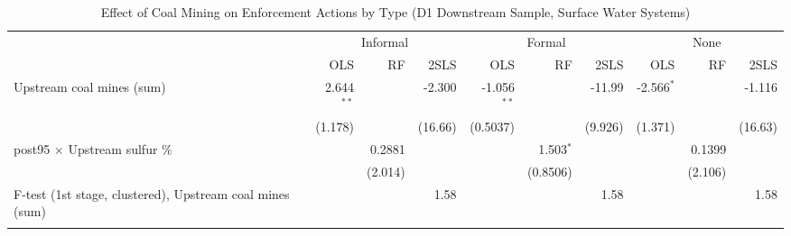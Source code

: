 
\begin{table}[htbp]
   
   \caption{\label{tab:h3_inf_formal_d12_surfacewater} Effect of Coal Mining on Enforcement Actions by Type (D1 Downstream Sample, Surface Water Systems)}
   \bigskip
   
   \centering
   
   \begin{adjustbox}{width = \textwidth, center}
      
      
      \begin{tabular}{lrrrrrrrrr}
         \toprule
         
          & \multicolumn{3}{c}{Informal} & \multicolumn{3}{c}{Formal} & \multicolumn{3}{c}{None}\\
         
                                                                  & OLS           & RF            & 2SLS          & OLS           & RF            & 2SLS          & OLS           & RF            & 2SLS\\  
         
         \midrule 
         Upstream coal mines (sum)                                & 2.644$^{**}$  &               & -2.300        & -1.056$^{**}$ &               & -11.99        & -2.566$^{*}$  &               & -1.116\\   
                                                                  & (1.178)       &               & (16.66)       & (0.5037)      &               & (9.926)       & (1.371)       &               & (16.63)\\   
         post95 $\times$ Upstream sulfur \%                       &               & 0.2881        &               &               & 1.503$^{*}$   &               &               & 0.1399        &   \\   
                                                                  &               & (2.014)       &               &               & (0.8506)      &               &               & (2.106)       &   \\   
         
         F-test (1st stage, clustered), Upstream coal mines (sum) &               &               & 1.58          &               &               & 1.58          &               &               & 1.58\\  
         
          \\
         

\end{tabular}
\end{adjustbox}
\end{table}
